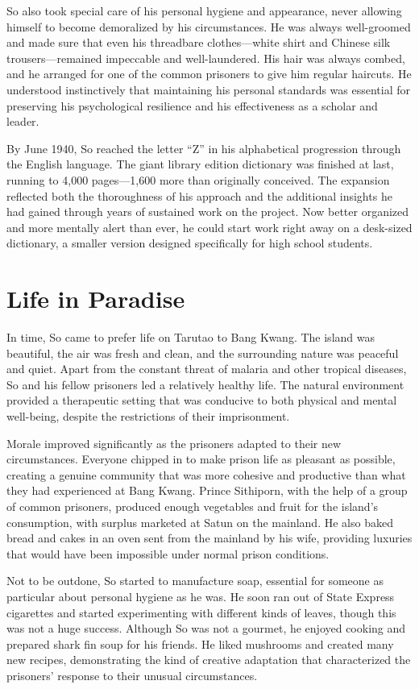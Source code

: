 \documentclass[
  Letterpaper,
]{scrbook}
\begin{document}
So also took special care of his personal hygiene and appearance, never
allowing himself to become demoralized by his circumstances. He was
always well-groomed and made sure that even his threadbare
clothes---white shirt and Chinese silk trousers---remained impeccable
and well-laundered. His hair was always combed, and he arranged for one
of the common prisoners to give him regular haircuts. He understood
instinctively that maintaining his personal standards was essential for
preserving his psychological resilience and his effectiveness as a
scholar and leader.

By June 1940, So reached the letter ``Z'' in his alphabetical
progression through the English language. The giant library edition
dictionary was finished at last, running to 4,000 pages---1,600 more
than originally conceived. The expansion reflected both the thoroughness
of his approach and the additional insights he had gained through years
of sustained work on the project. Now better organized and more mentally
alert than ever, he could start work right away on a desk-sized
dictionary, a smaller version designed specifically for high school
students.

\section{Life in Paradise}\label{life-in-paradise}

In time, So came to prefer life on Tarutao to Bang Kwang. The island was
beautiful, the air was fresh and clean, and the surrounding nature was
peaceful and quiet. Apart from the constant threat of malaria and other
tropical diseases, So and his fellow prisoners led a relatively healthy
life. The natural environment provided a therapeutic setting that was
conducive to both physical and mental well-being, despite the
restrictions of their imprisonment.

Morale improved significantly as the prisoners adapted to their new
circumstances. Everyone chipped in to make prison life as pleasant as
possible, creating a genuine community that was more cohesive and
productive than what they had experienced at Bang Kwang. Prince
Sithiporn, with the help of a group of common prisoners, produced enough
vegetables and fruit for the island's consumption, with surplus marketed
at Satun on the mainland. He also baked bread and cakes in an oven sent
from the mainland by his wife, providing luxuries that would have been
impossible under normal prison conditions.

Not to be outdone, So started to manufacture soap, essential for someone
as particular about personal hygiene as he was. He soon ran out of State
Express cigarettes and started experimenting with different kinds of
leaves, though this was not a huge success. Although So was not a
gourmet, he enjoyed cooking and prepared shark fin soup for his friends.
He liked mushrooms and created many new recipes, demonstrating the kind
of creative adaptation that characterized the prisoners' response to
their unusual circumstances.
\end{document}
